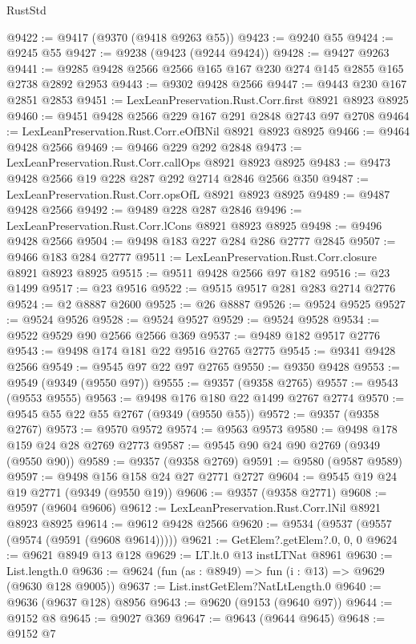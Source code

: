 \begin{lexlean}{RustStd}
\begin{coremodule}
{\begin{coremodule}
{{{{{{{{{{{{{{{{{{{{{{{{{{{{{{{{{{{{{{{@9422 := @9417 (@9370 (@9418 @9263 @55))
@9423 := @9240 @55
@9424 := @9245 @55
@9427 := @9238 (@9423 (@9244 @9424))
@9428 := @9427 @9263
@9441 := @9285 @9428 @2566 @2566 @165 @167 @230 @274 @145 @2855 @165 @2738 @2892 @2953
@9443 := @9302 @9428 @2566
@9447 := @9443 @230 @167 @2851 @2853
@9451 := LexLeanPreservation.Rust.Corr.first @8921 @8923 @8925
@9460 := @9451 @9428 @2566 @229 @167 @291 @2848 @2743 @97 @2708
@9464 := LexLeanPreservation.Rust.Corr.eOfBNil @8921 @8923 @8925
@9466 := @9464 @9428 @2566
@9469 := @9466 @229 @292 @2848
@9473 := LexLeanPreservation.Rust.Corr.callOps @8921 @8923 @8925
@9483 := @9473 @9428 @2566 @19 @228 @287 @292 @2714 @2846 @2566 @350
@9487 := LexLeanPreservation.Rust.Corr.opsOfL @8921 @8923 @8925
@9489 := @9487 @9428 @2566
@9492 := @9489 @228 @287 @2846
@9496 := LexLeanPreservation.Rust.Corr.lCons @8921 @8923 @8925
@9498 := @9496 @9428 @2566
@9504 := @9498 @183 @227 @284 @286 @2777 @2845
@9507 := @9466 @183 @284 @2777
@9511 := LexLeanPreservation.Rust.Corr.closure @8921 @8923 @8925
@9515 := @9511 @9428 @2566 @97 @182
@9516 := @23 @1499
@9517 := @23 @9516
@9522 := @9515 @9517 @281 @283 @2714 @2776
@9524 := @2 @8887 @2600
@9525 := @26 @8887
@9526 := @9524 @9525
@9527 := @9524 @9526
@9528 := @9524 @9527
@9529 := @9524 @9528
@9534 := @9522 @9529 @90 @2566 @2566 @369
@9537 := @9489 @182 @9517 @2776
@9543 := @9498 @174 @181 @22 @9516 @2765 @2775
@9545 := @9341 @9428 @2566
@9549 := @9545 @97 @22 @97 @2765
@9550 := @9350 @9428
@9553 := @9549 (@9349 (@9550 @97))
@9555 := @9357 (@9358 @2765)
@9557 := @9543 (@9553 @9555)
@9563 := @9498 @176 @180 @22 @1499 @2767 @2774
@9570 := @9545 @55 @22 @55 @2767 (@9349 (@9550 @55))
@9572 := @9357 (@9358 @2767)
@9573 := @9570 @9572
@9574 := @9563 @9573
@9580 := @9498 @178 @159 @24 @28 @2769 @2773
@9587 := @9545 @90 @24 @90 @2769 (@9349 (@9550 @90))
@9589 := @9357 (@9358 @2769)
@9591 := @9580 (@9587 @9589)
@9597 := @9498 @156 @158 @24 @27 @2771 @2727
@9604 := @9545 @19 @24 @19 @2771 (@9349 (@9550 @19))
@9606 := @9357 (@9358 @2771)
@9608 := @9597 (@9604 @9606)
@9612 := LexLeanPreservation.Rust.Corr.lNil @8921 @8923 @8925
@9614 := @9612 @9428 @2566
@9620 := @9534 (@9537 (@9557 (@9574 (@9591 (@9608 @9614)))))
@9621 := GetElem?.getElem?.{0, 0, 0}
@9624 := @9621 @8949 @13 @128
@9629 := LT.lt.{0} @13 instLTNat @8961
@9630 := List.length.{0}
@9636 := @9624 (fun (as : @8949) => fun (i : @13) => @9629 (@9630 @128 @9005))
@9637 := List.instGetElem?NatLtLength.{0}
@9640 := @9636 (@9637 @128) @8956
@9643 := @9620 (@9153 (@9640 @97))
@9644 := @9152 @8
@9645 := @9027 @369
@9647 := @9643 (@9644 @9645)
@9648 := @9152 @7
}}}}}}}}}}}}}}}}}}}}}}}}}}}}}}}}}}}}}}}
\end{coremodule}}
\end{coremodule}
\end{lexlean}
